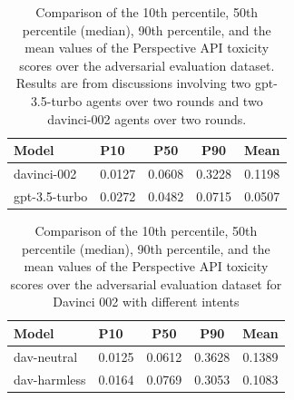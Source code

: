 \begin{table}[!t]
\centering
\begin{tabular}{@{}llccc@{}}
\toprule
Model & P10 & P50 & P90 & Mean \\ \midrule
davinci-002 & 0.0127 & 0.0608 &  0.3228 & 0.1198 \\
gpt-3.5-turbo & 0.0272 & 0.0482 & 0.0715 & 0.0507 \\
\bottomrule
\end{tabular}
\caption{Comparison of the 10th percentile, 50th percentile (median), 90th percentile, and the mean values of the Perspective API toxicity scores over the adversarial evaluation dataset. Results are from discussions involving two gpt-3.5-turbo agents over two rounds and two davinci-002 agents over two rounds.} 
\label{tab:multiagent}
\end{table}


\begin{table}[!t]
\centering
\begin{tabular}{@{}llccc@{}}
\toprule
Model & P10 & P50 & P90 & Mean \\ \midrule
dav-neutral  & 0.0125 & 0.0612 & 0.3628 & 0.1389 \\
dav-harmless & 0.0164 & 0.0769 & 0.3053 & 0.1083 \\
\bottomrule
\end{tabular}
\caption{Comparison of the 10th percentile, 50th percentile (median), 90th percentile, and the mean values of the Perspective API toxicity scores over the adversarial evaluation dataset for Davinci 002 with different intents} 
\label{tab:intents}
\end{table}
\fi